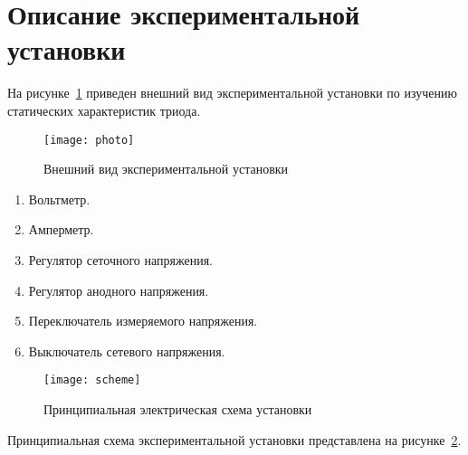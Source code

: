\section{Описание экспериментальной установки}

На рисунке~\ref{picLook} приведен внешний вид экспериментальной установки по
изучению статических характеристик триода.

\begin{figure}[ht]
  \center
  \texttt{[image: photo]}
    \caption{Внешний вид экспериментальной установки} \label{picLook}
\end{figure}

\begin{enumerate}
  \item Вольтметр.
  \item Амперметр.
  \item Регулятор сеточного напряжения.
  \item Регулятор анодного напряжения.
  \item Переключатель измеряемого напряжения.
  \item Выключатель сетевого напряжения.
\end{enumerate}

\begin{figure}[ht]
  \center
  \texttt{[image: scheme]}
    \caption{Принципиальная электрическая схема установки} \label{picScheme}
\end{figure}

Принципиальная схема экспериментальной установки представлена на
рисунке~\ref{picScheme}.

